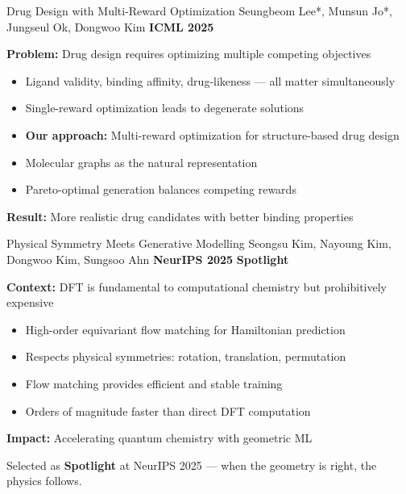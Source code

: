 \documentclass[aspectratio=169,11pt]{beamer}
\newcommand{\papercite}[1]{{\scriptsize\color{mutedText}#1}}
\newcommand{\venue}[1]{{\small\textcolor{postechBlue}{\textbf{#1}}}}
\newcommand{\badge}[1]{\colorbox{anuGold}{\scriptsize\color{white}\textbf{#1}}}
\begin{document}
\begin{frame}{Drug Design with Multi-Reward Optimization}
  \papercite{Seungbeom Lee*, Munsun Jo*, Jungseul Ok, Dongwoo Kim \hfill \venue{ICML 2025}}
  \vspace{8pt}

  \textbf{Problem:} Drug design requires optimizing \alert{multiple competing objectives}
  \vspace{6pt}

  \begin{itemize}
    \item Ligand validity, binding affinity, drug-likeness --- all matter simultaneously
    \item Single-reward optimization leads to degenerate solutions
    \item \textbf{Our approach:} Multi-reward optimization for structure-based drug design
    \item Molecular \alert{graphs} as the natural representation
    \item Pareto-optimal generation balances competing rewards
  \end{itemize}
  \vspace{8pt}

  \textbf{Result:} More realistic drug candidates with better binding properties
\end{frame}

\begin{frame}{Physical Symmetry Meets Generative Modelling}
  \papercite{Seongsu Kim, Nayoung Kim, Dongwoo Kim, Sungsoo Ahn \hfill \venue{NeurIPS 2025} \badge{Spotlight}}
  \vspace{8pt}

  \textbf{Context:} DFT is fundamental to computational chemistry but prohibitively expensive
  \vspace{6pt}

  \begin{itemize}
    \item \alert{High-order equivariant} flow matching for Hamiltonian prediction
    \item Respects physical symmetries: rotation, translation, permutation
    \item Flow matching provides efficient and stable training
    \item Orders of magnitude faster than direct DFT computation
  \end{itemize}
  \vspace{8pt}

  \textbf{Impact:} Accelerating quantum chemistry with geometric ML

  \vspace{4pt}
  {\small Selected as \badge{Spotlight} at NeurIPS 2025 --- when the geometry is right, the physics follows.}
\end{frame}
\end{document}
